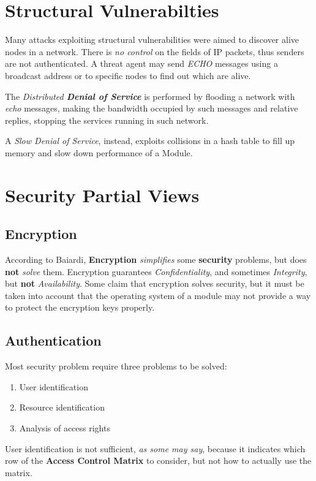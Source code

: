 

\section{Structural Vulnerabilties}
Many attacks exploiting structural vulnerabilities were aimed to discover alive nodes in a network.
There is \textit{no control} on the fields of IP packets, thus senders are not authenticated.
A threat agent may send \textit{ECHO} messages using a broadcast address or to specific nodes to find out which are alive.

The \textit{Distributed \textbf{Denial of Service}} is performed by flooding a network with \textit{echo} messages,
making the bandwidth occupied by such messages and relative replies,
stopping the services running in such network.

A \textit{Slow Denial of Service}, instead, exploits collisions in a hash table to fill up memory and slow down performance of a Module.

\section{Security Partial Views}
\subsection{Encryption}
According to Baiardi, \textbf{Encryption} \textit{simplifies} some \textbf{security} problems, but does \textbf{not} \textit{solve} them.
Encryption guarantees \textit{Confidentiality}, and sometimes \textit{Integrity}, but \textbf{not} \textit{Availability}.
Some claim that encryption solves security, but it must be taken into account that the operating system of a module may not provide a way to protect the encryption keys properly.

\subsection{Authentication}
Most security problem require three problems to be solved:
\begin{enumerate}
    \item User identification
    \item Resource identification
    \item Analysis of access rights
\end{enumerate}
User identification is not sufficient, \textit{as some may say}, because it indicates which row of the \textbf{Access Control Matrix} to consider, but not how to actually use the matrix.

